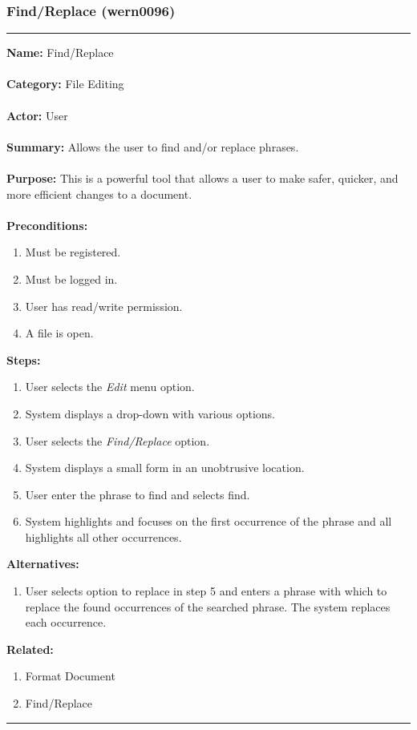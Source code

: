 \documentclass[11pt]{report}
\begin{document}
\newpage

\subsubsection{Find/Replace (wern0096)}
\vspace{2pt}
\hrule
\vspace{8pt}
	\noindent\textbf{Name:} Find/Replace \\ \\
	\textbf{Category:} File Editing \\ \\
	\textbf{Actor:} User \\ \\
	\textbf{Summary:} Allows the user to find and/or replace phrases. \\ \\
	\textbf{Purpose:} This is a powerful tool that allows a user to make safer, quicker, and more efficient changes to a document. \\ \\
	\textbf{Preconditions:} 
	\begin{enumerate}
		\item Must be registered.
		\item Must be logged in.
		\item User has read/write permission.
		\item A file is open.
	\end{enumerate}
	\textbf{Steps:}
	\begin{enumerate}
		\item User selects the \textit{Edit} menu option.
		\item System displays a drop-down with various options.
		\item User selects the \textit{Find/Replace} option.
		\item System displays a small form in an unobtrusive location.
		\item User enter the phrase to find and selects find.
		\item System highlights and focuses on the first occurrence of the phrase and all highlights all other occurrences.
	\end{enumerate}
	\textbf{Alternatives:}
	\begin{enumerate}
		\item User selects option to replace in step 5 and enters a phrase with which to replace the found occurrences of the searched phrase. The system replaces each occurrence.
	\end{enumerate}
	\textbf{Related:}
	\begin{enumerate}
		\item Format Document
		\item Find/Replace
	\end{enumerate}
\hrule
\vspace{8pt}
\end{document}
